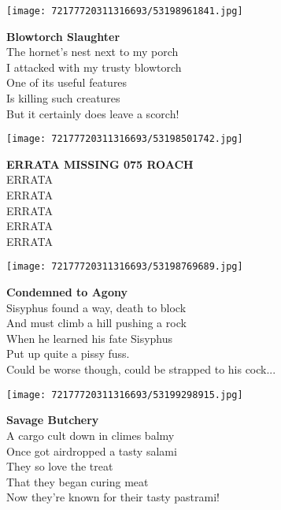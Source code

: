 \documentclass[10pt,letterpaper]{article}
\begin{document}
\begin{center}\texttt{[image: 72177720311316693/53198961841.jpg]}
\end{center}
\begin{center}
\textbf{Blowtorch Slaughter}\\
\vskip 0.2in
The hornet's nest next to my porch\\
I attacked with my trusty blowtorch\\
One of its useful features\\
Is killing such creatures\\
But it certainly does leave a scorch!\\
\end{center}
\pagebreak

\begin{center}\texttt{[image: 72177720311316693/53198501742.jpg]}
\end{center}
\begin{center}
\textbf{ERRATA MISSING 075 ROACH}\\
\vskip 0.2in
ERRATA\\
ERRATA\\
ERRATA\\
ERRATA\\
ERRATA\\
\end{center}
\pagebreak

\begin{center}
\texttt{[image: 72177720311316693/53198769689.jpg]}
\end{center}

\begin{center}
\textbf{Condemned to Agony}\\
\vskip 0.2in
Sisyphus found a way, death to block\\
And must climb a hill pushing a rock\\
When he learned his fate Sisyphus\\
Put up quite a pissy fuss.\\
Could be worse though, could be strapped to his cock...\\
\end{center}
\pagebreak

\begin{center}\texttt{[image: 72177720311316693/53199298915.jpg]}
\end{center}
\begin{center}
\textbf{Savage Butchery}\\
\vskip 0.2in
A cargo cult down in climes balmy\\
Once got airdropped a tasty salami\\
They so love the treat\\
That they began curing meat\\
Now they're known for their tasty pastrami!\\
\end{center}
\pagebreak
\end{document}
